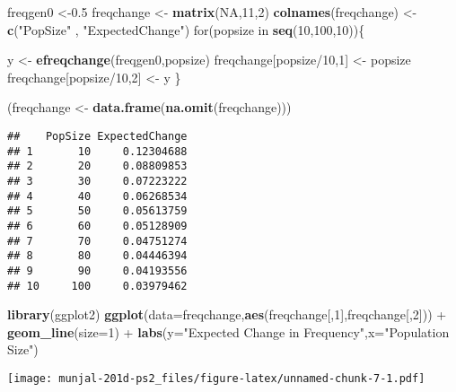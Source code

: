\documentclass[]{article}
\newenvironment{Shaded}{\begin{snugshade}}{\end{snugshade}}
\newcommand{\KeywordTok}[1]{\textcolor[rgb]{0.13,0.29,0.53}{\textbf{{#1}}}}
\newcommand{\DataTypeTok}[1]{\textcolor[rgb]{0.13,0.29,0.53}{{#1}}}
\newcommand{\DecValTok}[1]{\textcolor[rgb]{0.00,0.00,0.81}{{#1}}}
\newcommand{\FloatTok}[1]{\textcolor[rgb]{0.00,0.00,0.81}{{#1}}}
\newcommand{\StringTok}[1]{\textcolor[rgb]{0.31,0.60,0.02}{{#1}}}
\newcommand{\OtherTok}[1]{\textcolor[rgb]{0.56,0.35,0.01}{{#1}}}
\newcommand{\NormalTok}[1]{{#1}}
\begin{document}
\begin{Shaded}
\begin{Highlighting}[]
\NormalTok{freqgen0 <-}\FloatTok{0.5}
\NormalTok{freqchange <-}\StringTok{ }\KeywordTok{matrix}\NormalTok{(}\OtherTok{NA}\NormalTok{,}\DecValTok{11}\NormalTok{,}\DecValTok{2}\NormalTok{)}
\KeywordTok{colnames}\NormalTok{(freqchange) <-}\StringTok{ }\KeywordTok{c}\NormalTok{(}\StringTok{"PopSize"} \NormalTok{, }\StringTok{"ExpectedChange"}\NormalTok{)}
\NormalTok{for(popsize in }\KeywordTok{seq}\NormalTok{(}\DecValTok{10}\NormalTok{,}\DecValTok{100}\NormalTok{,}\DecValTok{10}\NormalTok{))\{}
  
  \NormalTok{y <-}\StringTok{ }\KeywordTok{efreqchange}\NormalTok{(freqgen0,popsize)}
  \NormalTok{freqchange[popsize/}\DecValTok{10}\NormalTok{,}\DecValTok{1}\NormalTok{] <-}\StringTok{ }\NormalTok{popsize}
  \NormalTok{freqchange[popsize/}\DecValTok{10}\NormalTok{,}\DecValTok{2}\NormalTok{] <-}\StringTok{ }\NormalTok{y}
\NormalTok{\}}

\NormalTok{(freqchange <-}\StringTok{ }\KeywordTok{data.frame}\NormalTok{(}\KeywordTok{na.omit}\NormalTok{(freqchange)))}
\end{Highlighting}
\end{Shaded}

\begin{verbatim}
##    PopSize ExpectedChange
## 1       10     0.12304688
## 2       20     0.08809853
## 3       30     0.07223222
## 4       40     0.06268534
## 5       50     0.05613759
## 6       60     0.05128909
## 7       70     0.04751274
## 8       80     0.04446394
## 9       90     0.04193556
## 10     100     0.03979462
\end{verbatim}

\begin{Shaded}
\begin{Highlighting}[]
\KeywordTok{library}\NormalTok{(ggplot2)}
\KeywordTok{ggplot}\NormalTok{(}\DataTypeTok{data=}\NormalTok{freqchange,}\KeywordTok{aes}\NormalTok{(freqchange[,}\DecValTok{1}\NormalTok{],freqchange[,}\DecValTok{2}\NormalTok{])) +}\StringTok{ }
\StringTok{        }\KeywordTok{geom_line}\NormalTok{(}\DataTypeTok{size=}\DecValTok{1}\NormalTok{) +}\StringTok{ }
\StringTok{        }\KeywordTok{labs}\NormalTok{(}\DataTypeTok{y=}\StringTok{"Expected Change in Frequency"}\NormalTok{,}\DataTypeTok{x=}\StringTok{"Population Size"}\NormalTok{)}
\end{Highlighting}
\end{Shaded}

\texttt{[image: munjal-201d-ps2\_files/figure-latex/unnamed-chunk-7-1.pdf]}
\end{document}
